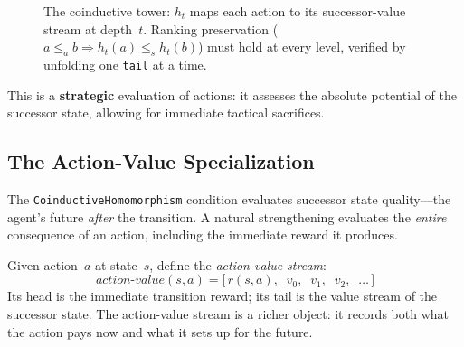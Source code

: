 \documentclass[runningheads]{llncs}
\begin{document}
\begin{figure}[H]
\centering
{}
\caption{The coinductive tower: $h_t$ maps each action to its successor-value stream at depth~$t$.  Ranking preservation ($a \le_a b \Rightarrow h_t(a) \le_s h_t(b)$) must hold at every level, verified by unfolding one \texttt{tail} at a time.}
\label{fig:tower}
\end{figure}

This is a \textbf{strategic} evaluation of actions: it assesses the absolute potential of the successor state, allowing for immediate tactical sacrifices.

\subsection{The Action-Value Specialization}

The \texttt{CoinductiveHomomorphism} condition evaluates successor state quality---the agent's future \emph{after} the transition.  A natural strengthening evaluates the \emph{entire} consequence of an action, including the immediate reward it produces.

Given action~$a$ at state~$s$, define the \emph{action-value stream}:
\[
\mathit{action\text{-}value}(s,a) = \bigl[\, r(s,a),\;\; v_0,\;\; v_1,\;\; v_2,\;\; \ldots \,\bigr]
\]
Its head is the immediate transition reward; its tail is the value stream of the successor state.  The action-value stream is a richer object: it records both what the action pays now and what it sets up for the future.
\end{document}
